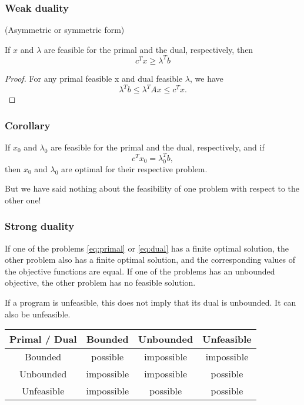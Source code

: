 \documentclass{beamer}
\begin{document}
\begin{frame}
	\frametitle{Weak duality}
	
	(Asymmetric or symmetric form)
	
	\mbox{}
	
	If $x$ and $\lambda$ are feasible for the primal and the dual, respectively, then
	\[
	c^T x \geq \lambda^T b
	\]
	
	\begin{proof}
		For any primal feasible x and dual feasible $\lambda$, we have
		\[
		\lambda^T b \leq \lambda^TAx \leq c^Tx.
		\]
	\end{proof}
	
\end{frame}

\begin{frame}
	\frametitle{Corollary}
	
	If $x_0$ and $\lambda_0$ are feasible for the primal and the dual, respectively, and if
	\[
	c^T x_0 = \lambda_0^T b,
	\]
	then $x_0$ and $\lambda_0$ are optimal for their respective problem.
	
	\mbox{}
	
	But we have said nothing about the feasibility of one problem with respect to the other one!
	
\end{frame}

\begin{frame}
	\frametitle{Strong duality}
	
	If one of the problems \eqref{eq:primal} or \eqref{eq:dual} has a finite optimal solution, the other problem also has a finite optimal solution, and the corresponding values of the objective functions are equal.
	If one of the problems has an unbounded objective, the other problem has no feasible solution.

\mbox{}

If a program is unfeasible, this does not imply that its dual is unbounded. It can also be unfeasible.

\mbox{}

\begin{center}
	\begin{tabular}{|c||c|c|c|}
		\hline
		Primal / Dual & Bounded & Unbounded & Unfeasible \\
		\hline
		\hline
		Bounded & possible & impossible & impossible \\
		\hline
		Unbounded & impossible & impossible & possible \\
		\hline
		Unfeasible & impossible & possible & possible \\
		\hline
	\end{tabular}
\end{center}

\end{frame}
\end{document}
